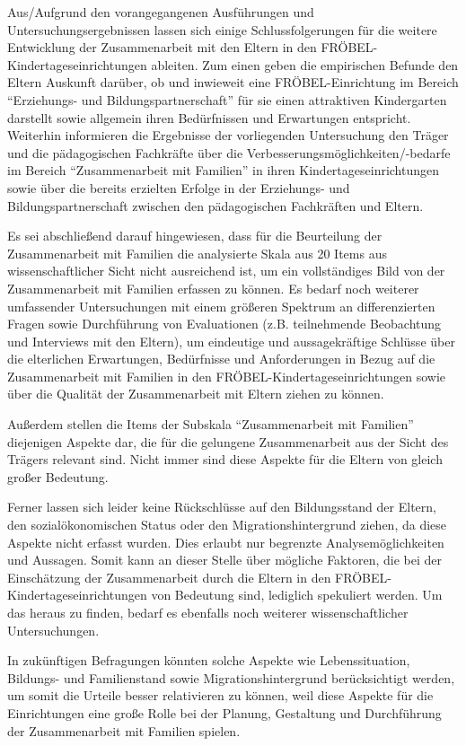 \documentclass[12pt,a4paper]{article}
\begin{document}
	 Aus/Aufgrund den vorangegangenen Ausführungen und Untersuchungsergebnissen lassen sich einige Schlussfolgerungen für die weitere Entwicklung der Zusammenarbeit mit den Eltern in den FRÖBEL-Kindertageseinrichtungen ableiten. Zum einen geben die empirischen Befunde den Eltern Auskunft darüber, ob und inwieweit eine FRÖBEL-Einrichtung im Bereich "`Erziehungs- und Bildungspartnerschaft"' für sie einen attraktiven Kindergarten darstellt sowie allgemein ihren Bedürfnissen und Erwartungen entspricht. Weiterhin informieren die Ergebnisse der vorliegenden Untersuchung den Träger und die pädagogischen Fachkräfte über die Verbesserungsmöglichkeiten/-bedarfe im Bereich "`Zusammenarbeit mit Familien"' in ihren Kindertageseinrichtungen sowie über die bereits erzielten Erfolge in der Erziehungs-  und Bildungspartnerschaft zwischen den pädagogischen Fachkräften und Eltern.
	 
	Es sei abschließend darauf hingewiesen, dass für die Beurteilung der Zusammenarbeit mit Familien die analysierte Skala aus 20 Items aus wissenschaftlicher Sicht nicht ausreichend ist, um ein vollständiges Bild von der Zusammenarbeit mit Familien erfassen zu können. Es bedarf noch weiterer umfassender Untersuchungen mit einem größeren Spektrum an differenzierten Fragen sowie Durchführung von Evaluationen (z.B. teilnehmende Beobachtung und Interviews mit den Eltern), um eindeutige und aussagekräftige Schlüsse über die elterlichen Erwartungen, Bedürfnisse und Anforderungen in Bezug auf die Zusammenarbeit mit Familien in den FRÖBEL-Kindertageseinrichtungen sowie über die Qualität der Zusammenarbeit mit Eltern ziehen zu können.
	
	Außerdem stellen die Items der Subskala "`Zusammenarbeit mit Familien"' diejenigen Aspekte dar, die für die gelungene Zusammenarbeit aus der Sicht des Trägers relevant sind. Nicht immer sind diese Aspekte für die Eltern von gleich großer Bedeutung. 
	
Ferner lassen sich leider keine Rückschlüsse auf den Bildungsstand der Eltern, den sozialökonomischen Status oder den Migrationshintergrund ziehen, da diese Aspekte nicht erfasst wurden. Dies erlaubt nur begrenzte Analysemöglichkeiten und Aussagen. Somit kann an dieser Stelle über mögliche Faktoren, die bei der Einschätzung der Zusammenarbeit durch die Eltern in den FRÖBEL-Kinder\-tages\-ein\-rich\-tun\-gen von Bedeutung sind, lediglich spekuliert werden. Um das heraus zu finden, bedarf es ebenfalls noch weiterer wissenschaftlicher Untersuchungen.

	In zukünftigen Befragungen könnten solche Aspekte wie Lebenssituation,  Bil\-dungs- und Familienstand sowie Migrationshintergrund berücksichtigt werden, um somit die Urteile besser relativieren zu können, weil diese Aspekte für die Einrichtungen eine große Rolle bei der Planung, Gestaltung und Durchführung der Zusammenarbeit mit Familien spielen.
	
\end{document}

